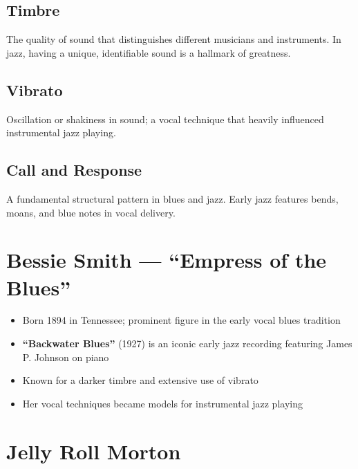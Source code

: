 \documentclass[11pt, letterpaper]{article}
\begin{document}
\subsection{Timbre}
The quality of sound that distinguishes different musicians and instruments. In jazz, having a unique, identifiable sound is a hallmark of greatness.

\subsection{Vibrato}
Oscillation or shakiness in sound; a vocal technique that heavily influenced instrumental jazz playing.

\subsection{Call and Response}
A fundamental structural pattern in blues and jazz. Early jazz features bends, moans, and blue notes in vocal delivery.

\section{Bessie Smith --- ``Empress of the Blues''}

\begin{itemize}
    \item Born 1894 in Tennessee; prominent figure in the early vocal blues tradition
    \item \textbf{``Backwater Blues''} (1927) is an iconic early jazz recording featuring James P. Johnson on piano
    \item Known for a darker timbre and extensive use of vibrato
    \item Her vocal techniques became models for instrumental jazz playing
\end{itemize}

\section{Jelly Roll Morton}
\end{document}
